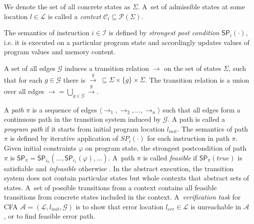 \noindent
We denote the set of all concrete states as $\Sigma$.  A~set of admissible
states at some location $l \in \mathcal{L}$ is called a \emph{context}
$\mathcal{C}_l \subseteq \mathcal{P}(\Sigma)$.

The semantics of instruction $i \in \mathcal{I}$ is defined by \emph{strongest
post condition} $\textsf{SP}_{i}(\cdot)$, i.e. it is executed on a particular program
state and accordingly updates values of program values and memory content.

A set of all edges $\mathcal{G}$ induces a transition relation $\rightarrow$ on
the set of states $\Sigma$, such that for each $g \in \mathcal{G}$ there is
$\xrightarrow{g} \: \subseteq \Sigma \times \{g\} \times \Sigma$. The
transition relation is a union over all edges $\rightarrow = \bigcup_{g
\in\mathcal{G}} \xrightarrow{g}$.

A \emph{path} $\pi$ is a sequence of edges $\langle
\rightarrow_1, \rightarrow_2, \dots, \rightarrow_n \rangle$ such that all edges
form a continuous path in the transition system induced by $\mathcal{G}$.  A path
is called a \emph{program path} if it starts from initial program location
$l_{\textit{init}}$. The semantics of path $\pi$ is defined by iterative
application of $SP_{i}( \cdot )$ for each instruction in path $\pi$. Given
initial constraints $\varphi$ on program state, the strongest postcondition of
path $\pi$ is $\textsf{SP}_{\pi} =
\textsf{SP}_{i_n}(\dots,\textsf{SP}_{i_1}(\varphi),\dots)$. A~path $\pi$ is
called \emph{feasible} if $\textsf{SP}_{\pi}(\textit{true})$ is satisfiable and
\emph{infeasible} otherwise \cite{Beyer2018b}.  In the abstract execution, the
transition system does not contain particular states but whole contexts that
abstract sets of states. A~set of possible transitions from a context contains
all feasible transitions from concrete states included in the context.
A~\emph{verification task} for  CFA $\mathcal{A} = (\mathcal{L},
l_{\textit{init}}, \mathcal{G})$ is to show that error location
$l_{\textit{err}} \in \mathcal{L}$ is unreachable in $\mathcal{A}$, or to find
feasible error path.

